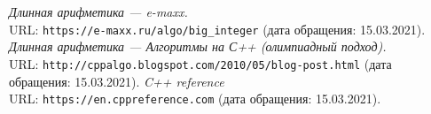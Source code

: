 \begin{thebibliography}{99}
{\itshape Длинная арифметика — e-maxx.} \\URL: \texttt{https://e-maxx.ru/algo/big\_integer} (дата обращения: 15.03.2021).
{\itshape Длинная арифметика — Алгоритмы на С++ (олимпиадный подход).} \\URL: \texttt{http://cppalgo.blogspot.com/2010/05/blog-post.html}
(дата обращения: 15.03.2021).
{\itshape C++ reference} \\URL: \texttt{https://en.cppreference.com} (дата обращения: 15.03.2021).

\end{thebibliography}
\pagebreak


